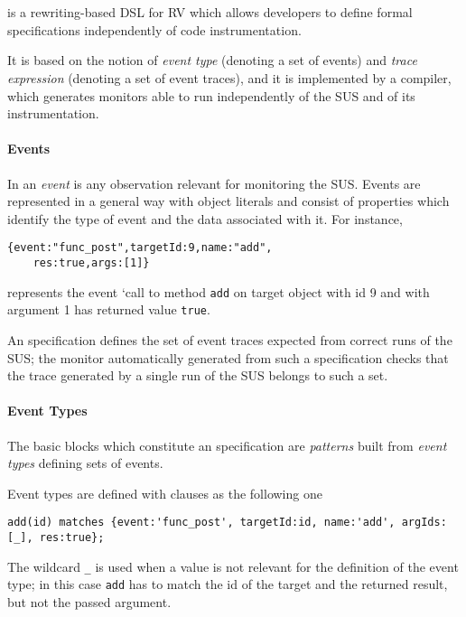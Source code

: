 \section{\rml}
\label{sec:rml}
\rml\cite{RML2021} is a rewriting-based DSL for RV which allows developers to define formal specifications independently of code instrumentation.

It  is based on the notion of \emph{event type} (denoting a set of events) and \emph{trace expression} (denoting a set of event traces),
and it is implemented by a compiler, which generates monitors able to run independently of the SUS and of its instrumentation. 

\paragraph{Events}
In \rml an \emph{event} is any observation relevant for monitoring the SUS.
Events are represented in a general way with object literals and
consist of properties which identify the type of event and the data associated with it. For instance,

\begin{lstlisting}
{event:"func_post",targetId:9,name:"add",
    res:true,args:[1]}
\end{lstlisting}          
represents the event
`call to method \lstinline{add} on target object with id 9 and with argument 1  has returned value \lstinline{true}.

An \rml specification defines the set of event traces expected from correct runs of the SUS; the monitor automatically generated from
such a specification checks that the trace generated by a single run of the SUS belongs to such a set.

\paragraph{Event Types}
The basic blocks which constitute an \rml specification are \emph{patterns} built from
\emph{event types} defining sets of events.

Event types are defined with clauses as the following one
\begin{lstlisting}[basicstyle=\ttfamily\scriptsize]
add(id) matches {event:'func_post', targetId:id, name:'add', argIds:[_], res:true};
\end{lstlisting}
The wildcard \lstinline!_! is used when a value is not relevant for
the definition of the event type; in this case \lstinline{add} has to match the
id of the target and the returned result, but not the passed argument.

